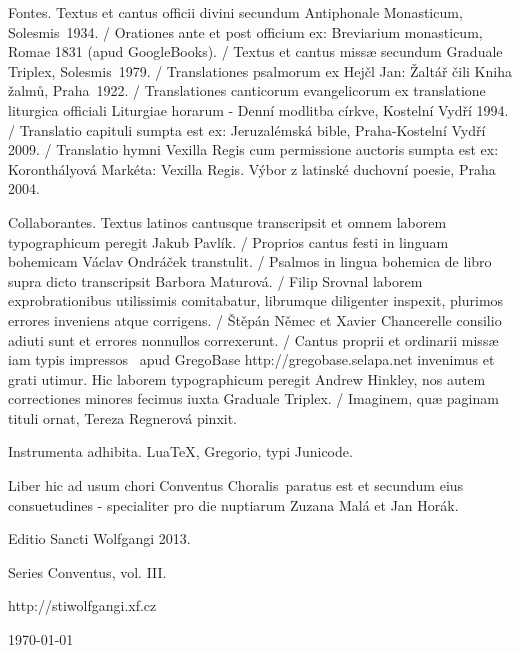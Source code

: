 \documentclass[a4paper, twoside, 12pt]{article}
\newcommand{\annusEditionis}{2013}
\begin{document}
Fontes. 
Textus et cantus officii divini secundum Antiphonale Monasticum, Solesmis~1934. /
Orationes ante et post officium ex: 
Breviarium monasticum, Romae 1831 (apud GoogleBooks). /
Textus et cantus missæ secundum Graduale Triplex, Solesmis~1979. /
Translationes psalmorum ex Hejčl Jan: Žaltář čili Kniha žalmů, Praha~1922. /
Translationes canticorum evangelicorum ex translatione liturgica officiali
Liturgiae horarum - Denní modlitba církve, Kostelní Vydří 1994. /
Translatio capituli sumpta est ex: 
Jeruzalémská bible, Praha-Kostelní Vydří 2009. /
Translatio hymni Vexilla Regis cum permissione auctoris sumpta est ex:
Koronthályová Markéta: Vexilla Regis. Výbor z latinské duchovní poesie,
Praha 2004. 

Collaborantes.
Textus latinos cantusque transcripsit et omnem laborem typographicum peregit
Jakub Pavlík. /
Proprios cantus festi in linguam bohemicam Václav Ondráček transtulit. /
Psalmos in lingua bohemica de libro supra dicto transcripsit
Barbora Maturová. /
Filip Srovnal laborem exprobrationibus utilissimis comitabatur,
librumque diligenter inspexit, plurimos errores inveniens atque corrigens. /
Štěpán Němec et Xavier Chancerelle consilio adiuti sunt et errores
nonnullos correxerunt. /
Cantus proprii et ordinarii missæ 
iam \guillemotright typis impressos\guillemotleft\mbox{ }
apud GregoBase
http://gregobase.selapa.net invenimus et grati utimur. Hic laborem typographicum
peregit Andrew Hinkley, nos autem correctiones minores fecimus
iuxta Graduale Triplex. /
Imaginem, quæ paginam tituli ornat, Tereza Regnerová pinxit.

Instrumenta adhibita.
LuaTeX, %
Gregorio, %
typi Junicode. %

\begin{center}
Liber hic ad usum chori 
\guillemotright Conventus Choralis\guillemotleft\ 
paratus est
et secundum eius consuetudines -
specialiter pro die nuptiarum Zuzana Malá et Jan Horák.

\vspace{1cm}

{\large Editio Sancti Wolfgangi \annusEditionis .}

\vspace{2mm}

Series \guillemotright Conventus\guillemotleft, vol. III.

\vspace{1cm}

http://stiwolfgangi.xf.cz
\vfill

\today

\end{center}
\end{document}

